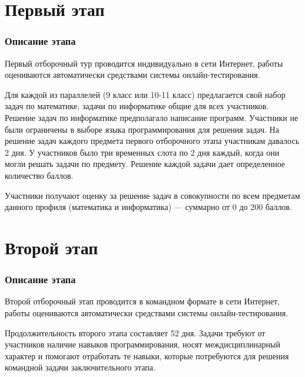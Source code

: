 \documentclass[a4paper,12pt,oneside]{book}
\begin{document}

\setcounter{tocdepth}{1}

\setcounter{page}{3}

\tableofcontents



\part{Первый этап}

\newpage

\section*{Описание этапа}

Первый отборочный тур проводится индивидуально в сети Интернет, работы оцениваются автоматически средствами системы онлайн-тестирования.

Для каждой из параллелей (9 класс или 10-11 класс) предлагается свой набор задач по математике, задачи по информатике общие для всех участников. Решение задач по информатике предполагало написание программ. Участники не были ограничены в выборе языка программирования для решения задач. На решение задач каждого предмета первого отборочного этапа участникам давалось 2 дня. У участников было три временных слота по 2 дня каждый, когда они могли решать задачи по предмету. Решение каждой задачи дает определенное количество баллов.

Участники получают оценку за решение задач в совокупности по всем предметам данного профиля (математика и информатика) --- суммарно от 0 до 200 баллов.
  


 
\part{Второй этап}
\newpage

\section*{Описание этапа}

Второй отборочный этап проводится в командном формате в сети Интернет, работы оцениваются автоматически средствами системы онлайн-тестирования.

Продолжительность второго этапа составляет 52 дня. Задачи требуют от участников наличие навыков программирования, носят междисциплинарный характер и помогают отработать те навыки, которые потребуются для решения командной задачи заключительного этапа.
\end{document}
